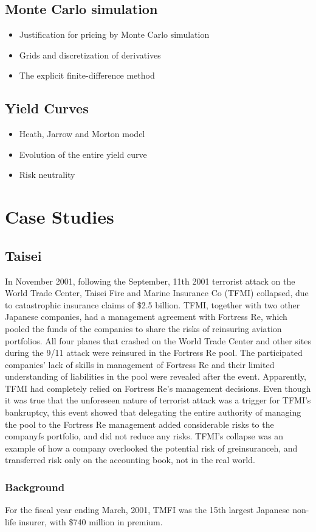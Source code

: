 \documentclass[12pt, a4paper]{report}
\begin{document}
\section{Monte Carlo simulation}
\begin{itemize} \item Justification for pricing by Monte Carlo simulation \item Grids and
discretization of derivatives \item The explicit finite-difference
method \end{itemize}

\section{Yield Curves}
\begin{itemize}
\item Heath, Jarrow and Morton model \item Evolution of the entire
yield curve \item Risk neutrality \end{itemize}

\newpage
\chapter{Case Studies}

\section{Taisei}


 In November 2001, following the September, 11th 2001
terrorist attack on the World Trade Center, Taisei Fire and Marine
Insurance Co (TFMI) collapsed, due to catastrophic insurance
claims of \$2.5 billion. TFMI, together with two other Japanese
companies, had a management agreement with Fortress Re, which
pooled the funds of the companies to share the risks of reinsuring
aviation portfolios. All four planes that crashed on the World
Trade Center and other sites during the 9/11 attack were reinsured
in the Fortress Re pool. The participated companies' lack of
skills in management of Fortress Re and their limited
understanding of liabilities in the pool were revealed after the
event. Apparently, TFMI had completely relied on Fortress Re's
management decisions. Even though it was true that the unforeseen
nature of terrorist attack was a trigger for TFMI's bankruptcy,
this event showed that delegating the entire authority of managing
the pool to the Fortress Re management added considerable risks to
the companyfs portfolio, and did not reduce any risks. TFMI's
collapse was an example of how a company overlooked the potential
risk of greinsuranceh, and transferred risk only on the
accounting book, not in the real world. \subsection{Background}
For the fiscal year ending March, 2001, TMFI was the 15th largest
Japanese non-life insurer, with \$740 million in premium.
\end{document}
